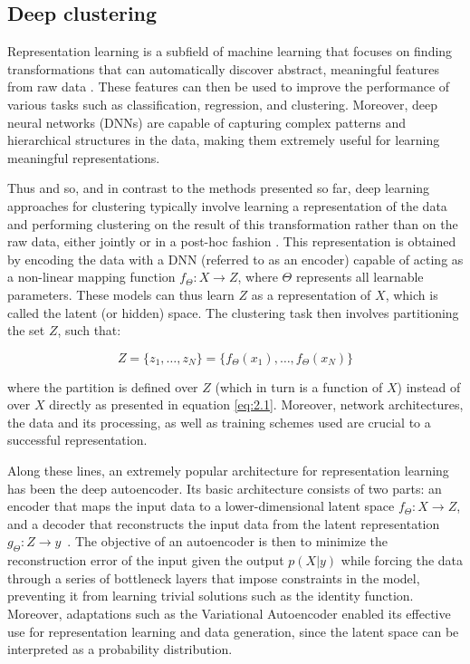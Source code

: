 \subsection{Deep clustering}

Representation learning is a subfield of machine learning that focuses on finding transformations that can automatically discover abstract, meaningful features from raw data \cite{Roberts2021TheTheory}. These features can then be used to improve the performance of various tasks such as classification, regression, and clustering. Moreover, deep neural networks (DNNs) are capable of capturing complex patterns and hierarchical structures in the data, making them extremely useful for learning meaningful representations.

Thus and so, and in contrast to the methods presented so far, deep learning approaches for clustering typically involve learning a representation of the data and performing clustering on the result of this transformation rather than on the raw data, either jointly or in a post-hoc fashion \cite{Lafabregue2022End-to-endStudy}. This representation is obtained by encoding the data with a DNN (referred to as an encoder) capable of acting as a non-linear mapping function $f_\Theta :X\rightarrow Z$, where $\Theta$ represents all learnable parameters. These models can thus learn  $Z$ as a representation of $X$, which is called the latent (or hidden) space. The clustering task then involves partitioning the set $Z$, such that:

\begin{equation}
Z = \{z_1, \ldots, z_N\} = \{f_\Theta(x_1), \ldots, f_\Theta(x_N)\}
\label{eq:2.7}
\end{equation}

\noindent where the partition is defined over $Z$ (which in turn is a function of $X$) instead of over $X$ directly as presented in equation \ref{eq:2.1}. Moreover, network architectures, the data and its processing, as well as training schemes used are crucial to a successful representation.

Along these lines, an extremely popular architecture for representation learning has been the deep autoencoder. Its basic architecture consists of two parts: an encoder that maps the input data to a lower-dimensional latent space $f_{\Theta} : X \rightarrow Z$, and a decoder that reconstructs the input data from the latent representation $g_{\Theta} : Z \rightarrow y$~\cite{Rubio2023Auto-EncodersPerspectives}. The objective of an autoencoder is then to minimize the reconstruction error of the input given the output $p(X|y)$ while forcing the data through a series of bottleneck layers that impose constraints in the model, preventing it from learning trivial solutions such as the identity function. Moreover, adaptations such as the Variational Autoencoder \cite{Kingma2013Auto-EncodingBayes} enabled its effective use for representation learning and data generation, since the latent space can be interpreted as a probability distribution.

